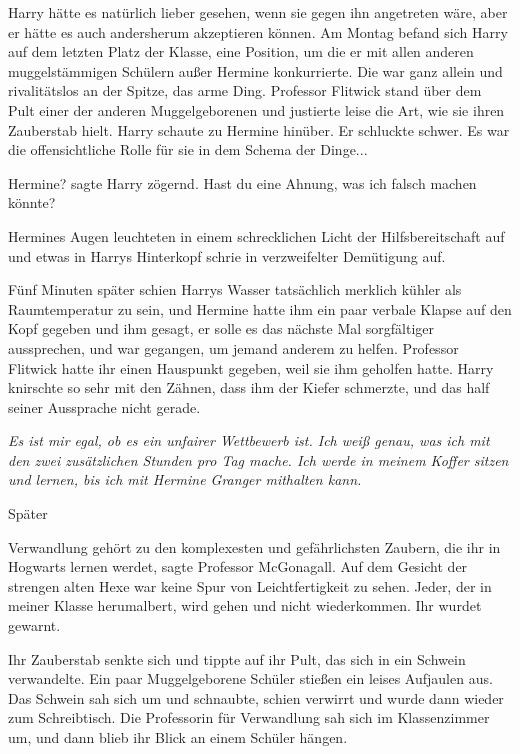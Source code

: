 Harry hätte es natürlich lieber gesehen, wenn sie gegen ihn angetreten wäre,
aber er hätte es auch andersherum akzeptieren können. Am Montag befand sich
Harry auf dem letzten Platz der Klasse, eine Position, um die er mit allen
anderen muggelstämmigen Schülern außer Hermine konkurrierte. Die war ganz allein
und rivalitätslos an der Spitze, das arme Ding. Professor Flitwick stand über
dem Pult einer der anderen Muggelgeborenen und justierte leise die Art, wie sie
ihren Zauberstab hielt. Harry schaute zu Hermine hinüber. Er schluckte schwer.
Es war die offensichtliche Rolle für sie in dem Schema der Dinge...

\glqq{}Hermine?\grqq{} sagte Harry zögernd. \glqq{}Hast du eine Ahnung, was ich
falsch machen könnte?\grqq{}

Hermines Augen leuchteten in einem schrecklichen Licht der Hilfsbereitschaft auf
und etwas in Harrys Hinterkopf schrie in verzweifelter Demütigung auf.

Fünf Minuten später schien Harrys Wasser tatsächlich merklich kühler als
Raumtemperatur zu sein, und Hermine hatte ihm ein paar verbale Klapse auf den
Kopf gegeben und ihm gesagt, er solle es das nächste Mal sorgfältiger
aussprechen, und war gegangen, um jemand anderem zu helfen. Professor Flitwick
hatte ihr einen Hauspunkt gegeben, weil sie ihm geholfen hatte. Harry knirschte
so sehr mit den Zähnen, dass ihm der Kiefer schmerzte, und das half seiner
Aussprache nicht gerade.

\emph{Es ist mir egal, ob es ein unfairer Wettbewerb ist. Ich weiß genau, was
ich mit den zwei zusätzlichen Stunden pro Tag mache. Ich werde in meinem Koffer
sitzen und lernen, bis ich mit Hermine Granger mithalten kann.}

Später

\glqq{}Verwandlung gehört zu den komplexesten und gefährlichsten Zaubern, die ihr
in Hogwarts lernen werdet\grqq{}, sagte Professor McGonagall. Auf dem Gesicht
der strengen alten Hexe war keine Spur von Leichtfertigkeit zu sehen. \glqq
Jeder, der in meiner Klasse herumalbert, wird gehen und nicht wiederkommen. Ihr
wurdet gewarnt.\grqq{}

Ihr Zauberstab senkte sich und tippte auf ihr Pult, das sich in ein Schwein
verwandelte. Ein paar Muggelgeborene Schüler stießen ein leises Aufjaulen aus.
Das Schwein sah sich um und schnaubte, schien verwirrt und wurde dann wieder zum
Schreibtisch. Die Professorin für Verwandlung sah sich im Klassenzimmer um, und
dann blieb ihr Blick an einem Schüler hängen.

